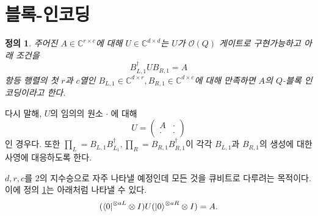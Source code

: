 \documentclass[a4paper,atbegshi,chapter]{oblivoir}
\newtheorem{defn}{정의}[chapter]
\begin{document}
\section{블록-인코딩}
\begin{defn}\label{def:15}
  주어진 $A\in\mathbb{C}^{r\times c}$에 대해 $U\in\mathbb{C}^{d\times d}$는
  $U$가 $\mathcal{O}(Q)$ 게이트로 구현가능하고 아래 조건을
  \[
    B_{L,1}^{\dagger}UB_{R,1}=A
  \]
  항등 행렬의 첫 $r$과 $c$열인 $B_{L,1}\in\mathbb{C}^{d\times r}, 
  B_{R,1}\in\mathbb{C}^{d\times c}$에 대해 만족하면 $A$의 $Q$-블록 인코딩이라고
  한다. 
\end{defn}
다시 말해, $U$의 임의의 원소 $\cdot\;$에 대해
  \[
    U=\begin{pmatrix}A & \cdot \\ \cdot &\cdot\end{pmatrix}
  \]
  인 경우다. 또한
  $\prod_L=B_{L,1}B^{\dagger}_{L_1}, \prod_R=B_{R,1}B_{R,1}^{\dagger}$이 각각
  $B_{L,1}$과 $B_{R,1}$의 생성에 대한 사영에 대응하도록 한다.

  $d,r,c$를 $2$의 지수승으로 자주 나타낼 예정인데 모든 것을 큐비트로 다루려는
  목적이다. 이에 정의 \ref{def:15}는 아래처럼 나타낼 수 있다.
  \[
    (\bra0^{\otimes aL}\otimes I)U(\ket0^{\otimes aR}\otimes I)=A.
  \]
\end{document}
